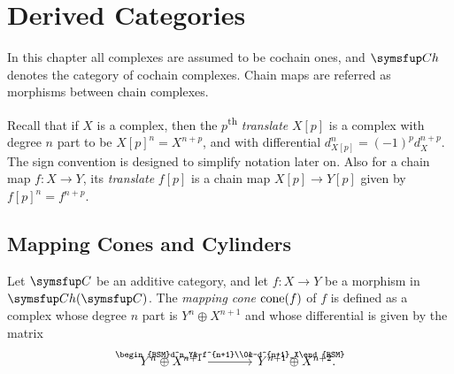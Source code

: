 
\chapter{Derived Categories}

In this chapter all complexes are assumed to be cochain ones, and $\CHX$ denotes the category of cochain complexes. Chain maps are referred as morphisms between chain complexes.

Recall that if $X$ is a complex, then the $p$\textsuperscript{th} \emph{translate} $X[p]$ is a complex with degree $n$ part to be $X[p]^n=X^{n+p}$, and with differential $d_{X[p]}^n=(-1)^pd_X^{n+p}$. The sign convention is designed to simplify notation later on. Also for a chain map $f\colon X\to Y$, its \emph{translate} $f[p]$ is a chain map $X[p]\to Y[p]$ given by $f[p]^n=f^{n+p}$.

\section{Mapping Cones and Cylinders}

Let $\CAT C$ be an additive category, and let $f\colon X\to Y$ be a morphism in $\CHX(\CAT C)$. The \emph{mapping cone} $\operatorname{cone}(f)$ of $f$ is defined as a complex whose degree $n$ part is $Y^n\oplus X^{n+1}$ and whose differential is given by the matrix
\begin{equation*}
  \begin{tikzcd}[ampersand replacement=\&,column sep=large,]
    Y^n\oplus X^{n+1} \& Y^{n+1}\oplus X^{n+2}.
    \arrow[from=1-1,]{1-2}[]{\begin{BSM}d^n_Y&-f^{n+1}\\0&-d^{n+1}_X\end{BSM}}
  \end{tikzcd}
\end{equation*}

